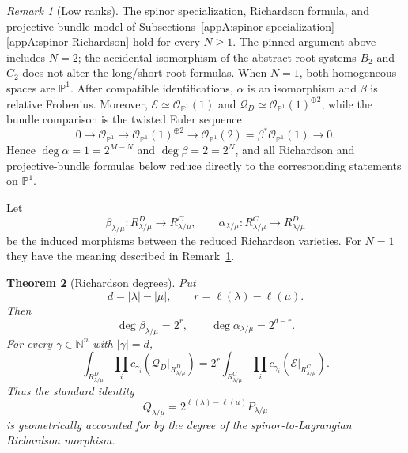 \documentclass[11pt,a4paper,oneside]{amsart}
\numberwithin{equation}{section}
\newtheorem{theorem}{Theorem}[section]
\theoremstyle{definition}
\theoremstyle{remark}
\newtheorem{remark}[theorem]{Remark}
\begin{document}
\begin{remark}[Low ranks]
\label{appA:rem:low-rank}
The spinor specialization, Richardson formula, and projective-bundle model
of Subsections~\ref{appA:spinor-specialization}--\ref{appA:spinor-Richardson}
hold for every $N\geq1$.  The pinned argument above includes $N=2$; the
accidental isomorphism of the abstract root systems $B_2$ and $C_2$ does not
alter the long/short-root formulas.  When $N=1$, both homogeneous spaces are $\mathbb P^1$.  After compatible
identifications, $\alpha$ is an isomorphism and $\beta$ is relative
Frobenius.  Moreover, $\mathcal E\simeq\mathcal O_{\mathbb P^1}(1)$ and
$\mathcal Q_D\simeq\mathcal O_{\mathbb P^1}(1)^{\oplus2}$, while the
bundle comparison is the twisted Euler sequence
\[
 0\longrightarrow\mathcal O_{\mathbb P^1}
 \longrightarrow\mathcal O_{\mathbb P^1}(1)^{\oplus2}
 \longrightarrow\mathcal O_{\mathbb P^1}(2)
 =\beta^*\mathcal O_{\mathbb P^1}(1)\longrightarrow0.
\]
Hence $\deg\alpha=1=2^{M-N}$ and $\deg\beta=2=2^N$, and all Richardson
and projective-bundle formulas below reduce directly to the corresponding
statements on $\mathbb P^1$.
\end{remark}

Let
\[
  \beta_{\lambda/\mu}:R^D_{\lambda/\mu}\longrightarrow R^C_{\lambda/\mu},
  \qquad
  \alpha_{\lambda/\mu}:R^C_{\lambda/\mu}\longrightarrow R^D_{\lambda/\mu}
\]
be the induced morphisms between the reduced Richardson varieties.  For
$N=1$ they have the meaning described in Remark~\ref{appA:rem:low-rank}.

\begin{theorem}[Richardson degrees]
\label{appA:thm:Richardson-degrees}
Put
\[
  d=|\lambda|-|\mu|,
  \qquad
  r=\ell(\lambda)-\ell(\mu).
\]
Then
\begin{equation}
\label{appA:eq:restricted-degrees}
  \deg\beta_{\lambda/\mu}=2^r,
  \qquad
  \deg\alpha_{\lambda/\mu}=2^{d-r}.
\end{equation}
For every $\gamma\in\mathbb N^n$ with $|\gamma|=d$,
\begin{equation}
\label{appA:eq:Chern-comparison}
  \int_{R^D_{\lambda/\mu}}
  \prod_i c_{\gamma_i}(\mathcal Q_D|_{R^D_{\lambda/\mu}})
  =2^r
  \int_{R^C_{\lambda/\mu}}
  \prod_i c_{\gamma_i}(\mathcal E|_{R^C_{\lambda/\mu}}).
\end{equation}
Thus the standard identity
\begin{equation}
\label{appA:eq:PQ-degree}
  Q_{\lambda/\mu}
  =2^{\ell(\lambda)-\ell(\mu)}P_{\lambda/\mu}
\end{equation}
is geometrically accounted for by the degree of the spinor-to-Lagrangian
Richardson morphism.
\end{theorem}
\end{document}
